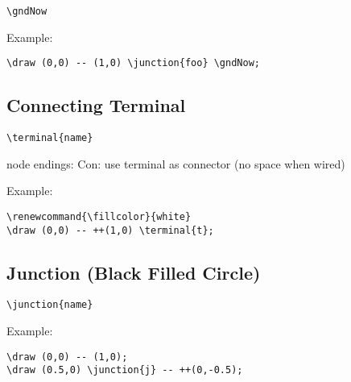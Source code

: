 \documentclass[parskip=full]{scrartcl}
\begin{document}
\begin{verbatim}
\gndNow
\end{verbatim}

Example:\\
\begin{minipage}{0.8\textwidth}
\begin{verbatim}
\draw (0,0) -- (1,0) \junction{foo} \gndNow;
\end{verbatim}
\end{minipage}
\begin{minipage}{0.19\textwidth}
\end{minipage}

\subsection{Connecting Terminal}

\begin{verbatim}
\terminal{name}
\end{verbatim}
node endings: Con: use terminal as connector (no space when wired)

Example:\\
\begin{minipage}{0.8\textwidth}
\begin{verbatim}
\renewcommand{\fillcolor}{white}
\draw (0,0) -- ++(1,0) \terminal{t};
\end{verbatim}
\end{minipage}
\begin{minipage}{0.19\textwidth}
\end{minipage}

\subsection{Junction (Black Filled Circle)}

\begin{verbatim}
\junction{name}
\end{verbatim}

Example:\\
\begin{minipage}{0.8\textwidth}
\begin{verbatim}
\draw (0,0) -- (1,0);
\draw (0.5,0) \junction{j} -- ++(0,-0.5);
\end{verbatim}
\end{minipage}
\begin{minipage}{0.19\textwidth}
\end{minipage}
\end{document}
